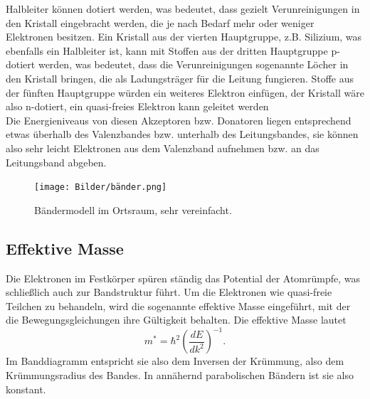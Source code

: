 Halbleiter können dotiert werden, was bedeutet, dass gezielt Verunreinigungen in den Kristall eingebracht werden, die je nach Bedarf mehr oder weniger Elektronen besitzen.
Ein Kristall aus der vierten Hauptgruppe, z.B. Silizium, was ebenfalls ein Halbleiter ist, kann mit Stoffen aus der dritten Hauptgruppe p-dotiert werden, was bedeutet, dass die Verunreinigungen sogenannte Löcher
in den Kristall bringen, die als Ladungsträger für die Leitung fungieren. Stoffe aus der fünften Hauptgruppe würden ein weiteres Elektron einfügen, der Kristall wäre also n-dotiert, ein quasi-freies Elektron kann geleitet werden\\
Die Energieniveaus von diesen Akzeptoren bzw. Donatoren liegen entsprechend etwas überhalb des Valenzbandes bzw. unterhalb des Leitungsbandes, sie können also sehr leicht Elektronen aus dem Valenzband aufnehmen bzw. an das Leitungsband abgeben.

\begin{figure}[H]
    \centering
    \texttt{[image: Bilder/bänder.png]}
    \caption{Bändermodell im Ortsraum, sehr vereinfacht. \cite{magnesium}}
    \label{fig:bänder}
\end{figure}

\subsection{Effektive Masse}

Die Elektronen im Festkörper spüren ständig das Potential der Atomrümpfe, was schließlich auch zur Bandstruktur führt. Um die Elektronen wie quasi-freie Teilchen zu behandeln, wird die sogenannte effektive Masse eingeführt,
mit der die Bewegungsgleichungen ihre Gültigkeit behalten. Die effektive Masse lautet
\begin{equation}
    m^{*} = \hbar^2 \left( \frac{dE}{dk^2} \right) ^{-1}.
    \label{eq:effektive_masse}
\end{equation}
Im Banddiagramm entspricht sie also dem Inversen der Krümmung, also dem Krümmungsradius des Bandes. In annähernd parabolischen Bändern ist sie also konstant.\\

